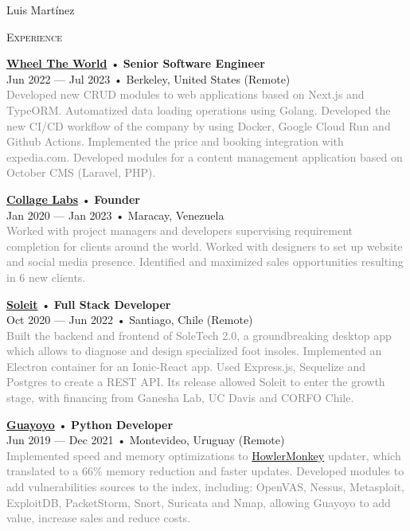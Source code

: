 \documentclass[12pt]{article}
\begin{document}
\begin{cv}{Luis Mart\'inez}
\begin{minipage}[t]{0.55\textwidth}
    \textrm{\textsc{\Large{Experience}}}
    \newline
    \parbox[t]{\linewidth}{
      \textbf{\href{https://wheeltheworld.com}{Wheel The World}} • \textrm{\textbf{Senior Software Engineer}}\\
      Jun 2022 --- Jul 2023 • Berkeley, United States (Remote)\\
      \footnotesize{\textcolor{gray}{Developed new CRUD modules to web applications based on Next.js and TypeORM. Automatized data loading operations using Golang. Developed the new CI/CD workflow of the company by using Docker, Google Cloud Run and Github Actions. Implemented the price and booking integration with expedia.com. Developed modules for a content management application based on October CMS (Laravel, PHP).}}\\
    }\vspace{0.125em}
    \parbox[t]{\linewidth}{
      \textbf{\href{https://collagelabs.org}{Collage Labs}} • \textrm{\textbf{Founder}}\\
      Jan 2020 --- Jan 2023 • Maracay, Venezuela\\
      \footnotesize{\textcolor{gray}{Worked with project managers and developers supervising requirement completion for clients around the world. Worked with designers to set up website and social media presence. Identified and maximized sales opportunities resulting in 6 new clients.}}\\
    }\vspace{0.125em}
    \parbox[t]{\linewidth}{
      \textbf{\href{https://soleit.app}{Soleit}} • \textrm{\textbf{Full Stack Developer}}\\
      Oct 2020 --- Jun 2022 • Santiago, Chile (Remote)\\
      \footnotesize{\textcolor{gray}{Built the backend and frontend of SoleTech 2.0, a groundbreaking desktop app which allows to diagnose and design specialized foot insoles. Implemented an Electron container for an Ionic-React app. Used Express.js, Sequelize and Postgres to create a REST API. Its release allowed Soleit to enter the growth stage, with financing from Ganesha Lab, UC Davis and CORFO Chile.}}\\
    }\vspace{0.125em}
    \parbox[t]{\linewidth}{
      \textbf{\href{https://guayoyo.io}{Guayoyo}} • \textrm{\textbf{Python Developer}}\\
      Jun 2019 --- Dec 2021 • Montevideo, Uruguay (Remote)\\
      \footnotesize{\textcolor{gray}{Implemented speed and memory optimizations to \href{https://howlermonkey.io}{HowlerMonkey} updater, which translated to a 66\% memory reduction and faster updates. Developed modules to add vulnerabilities sources to the index, including: OpenVAS, Nessus, Metasploit, ExploitDB, PacketStorm, Snort, Suricata and Nmap, allowing Guayoyo to add value, increase sales and reduce costs.}}\\
}
\end{minipage}
\end{cv}
\end{document}
